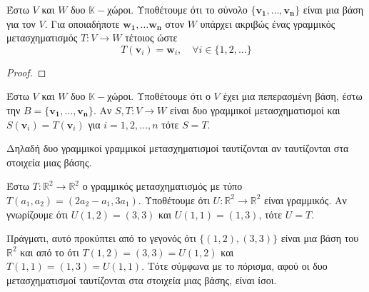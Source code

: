 \begin{thm}
  Έστω $V$ και $W$ δυο $ \mathbb{K}- $χώροι. Υποθέτουμε ότι το σύνολο 
  $ \{ \mathbf{v_{1}}, \ldots, \mathbf{v_{n}}\} $ είναι μια βάση για τον $V$. 
  Για οποιαδήποτε $ \mathbf{w_{1}}, \ldots \mathbf{w_{n}} $ στον $W$ υπάρχει 
  ακριβώς ένας γραμμικός μετασχηματισμός $ T \colon V \to W $ τέτοιος ώστε
  \[
    T(\mathbf{v}_{i}) = \mathbf{w}_{i}, \quad \forall i \in \{ 1,2, \ldots \}
  \] 
\end{thm}

\begin{proof}
\end{proof}

\begin{cor}
  Έστω $V$ και $W$ δυο $ \mathbb{K}- $χώροι. Υποθέτουμε ότι ο $V$ έχει μια πεπερασμένη 
  βάση, έστω την $ B = \{ \mathbf{v_{1}}, \ldots, \mathbf{v_{n}} \} $. Αν 
  $ S,T \colon V \to W$ είναι δυο γραμμικοί μετασχηματισμοί και 
  $ S(\mathbf{v}_{i}) = T(\mathbf{v}_{i}) $ για $ i=1,2,\ldots,n $ τότε $ S=T $.
\end{cor}

\begin{rem}
  Δηλαδή δυο γραμμικοί γραμμικοί μετασχηματισμοί ταυτίζονται αν ταυτίζονται στα στοιχεία
  μιας βάσης.
\end{rem}

\begin{example}
  Έστω $ T \colon \mathbb{R}^{2} \to \mathbb{R}^{2} $ ο γραμμικός μετασχηματισμός με 
  τύπο $ T(a_{1}, a_{2}) = (2 a_{2}- a_{1}, 3 a_{1}) $. 
  Υποθέτουμε ότι $ U \colon \mathbb{R}^{2} \to \mathbb{R}^{2} $ είναι γραμμικός. Αν 
  γνωρίζουμε ότι $ U(1,2) = (3,3) $ και $ U(1,1) = (1,3) $, τότε $ U=T $. 

  Πράγματι, αυτό προκύπτει από το γεγονός ότι $ \{ (1,2), (3,3) \}  $ είναι μια βάση 
  του $ \mathbb{R}^{2} $ και από το ότι $ T(1,2)=(3,3) = U(1,2) $ και 
  $ T(1,1) = (1,3) = U(1,1) $. Τότε σύμφωνα με το πόρισμα, αφού οι δυο μετασχηματισμοί 
  ταυτίζονται στα στοιχεία μιας βάσης, είναι ίσοι.
\end{example}



 
